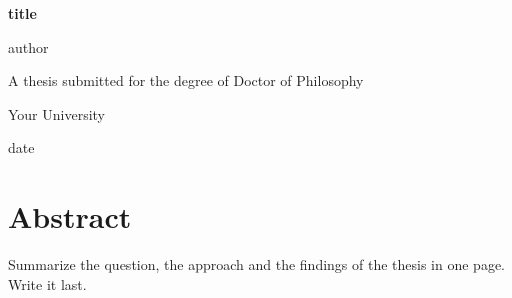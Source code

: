 \documentclass[11pt,a4paper,oneside]{report}
\newcommand{\thesistitle}{{{title}}}
\newcommand{\thesisauthor}{{{author}}}
\newcommand{\thesisdate}{{{date}}}
\newcommand{\thesisdegree}{A thesis submitted for the degree of Doctor of Philosophy}
\newcommand{\thesisinstitution}{Your University}
\begin{document}
\begin{titlepage}
  \centering
  \vspace*{4cm}
  {\Huge\bfseries \thesistitle\par}
  \vspace{2cm}
  {\Large \thesisauthor\par}
  \vfill
  {\large \thesisdegree\par}
  \vspace{0.4cm}
  {\large \thesisinstitution\par}
  \vspace{0.4cm}
  {\large \thesisdate\par}
  \vspace*{1.5cm}
\end{titlepage}


\chapter*{Abstract}

Summarize the question, the approach and the findings of the thesis in one
page. Write it last.

{\hypersetup{linkcolor=black}\tableofcontents}

\cleardoublepage
{}





\cleardoublepage
{}
{}


\end{document}
